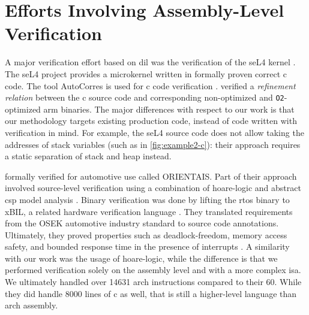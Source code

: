 \begin{comment}
  Building on such models (specifically, the \gls{arm} specification), \textcite{jiang2022examiner} checked for inconsistencies and bugs in \ac{cpu} emulators such as \ac{qemu} and \texttt{angr}\index{angr}.
  They were able to uncover thousands of situations where the instruction stream generated according to the official specification did not match up to that produced by emulators.
  They also uncovered twelve bugs that influenced the behavior of various common instructions.
  We perform a similar validation of our modeling of library functions for exception handling purposes in \cref{ch:eicfg-validation}.
  However, we lack a structured specification to generate semantics from or test against, so we tested against real-world implementations instead (and uncovered several bugs in our model).
\end{comment}

\section{Efforts Involving Assembly-Level Verification}
\label{se:integrated_assembly}
A major verification effort based on \acl{dil}
was the verification of the seL4 kernel \autocite{klein2009sel4,klein2014comprehensive}.
The seL4 project provides a microkernel written in formally proven correct \gls{c} code.
The tool AutoCorres is used for \gls{c} code verification \autocite{greenaway2012bridging}.
\Textcite{sewell2013tvv} verified a \emph{refinement relation} between the \gls{c} source code
and corresponding non-optimized and \lstinline|O2|-optimized \gls{arm} binaries.
The major differences with respect to our work
is that our methodology targets existing production code,
instead of code written with verification in mind.
For example, the seL4 source code does not allow taking the addresses of stack variables
(such as in \cref{fig:example2-c}):
their approach requires a static separation of stack and heap instead.

\Textcite{shi2012orientais} formally verified  for automotive use
called ORIENTAIS.
Part of their approach involved source-level verification
using a combination of \gls{hoare-logic}
and abstract \ac{csp} model analysis \autocite{hoare1978csp}.
Binary verification was done by lifting the \ac{rtos} binary to xBIL,
a related hardware verification language \autocite{shi2012xbil}.
They translated requirements from the OSEK automotive industry standard
to source code annotations.
Ultimately, they proved properties such as deadlock-freedom, memory access safety,
and bounded response time in the presence of interrupts \autocite{shi2012interrupt}.
A similarity with our work was the usage of \gls{hoare-logic},
while the difference is that we performed verification solely on the assembly level
and with a more complex \ac{isa}.
We ultimately handled over \num{14631} \gls{arch} instructions compared to their \num{60}.
While they did handle \num{8000} lines of \gls{c} as well,
that is still a higher-level language than \gls{arch} assembly.

